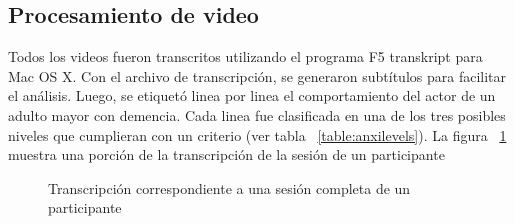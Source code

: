 	\subsection{Procesamiento de video}\label{secc:videoprocesing}

	Todos los videos fueron transcritos utilizando el programa F5 transkript para Mac OS X. Con el archivo de transcripci\'on, se generaron subt\'itulos para facilitar el an\'alisis. Luego, se etiquet\'o linea por linea el comportamiento del actor de un adulto mayor con demencia. Cada linea fue clasificada en una de los tres posibles niveles que cumplieran con un criterio (ver tabla ~\ref{table:anxilevels}).  La figura ~\ref{fig:f5transcript} muestra una porci\'on de la transcripci\'on de la sesi\'on de un participante
\begin{figure}[h!]
        \centering
        \caption{Transcripci\'on correspondiente a una sesi\'on completa de un participante}\label{fig:f5transcript}
\end{figure}



